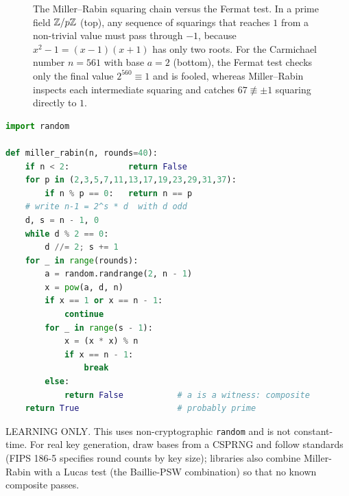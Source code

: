 \begin{figure}[H]
\caption{The Miller--Rabin squaring chain versus the Fermat test. In a prime field $\mathbb{Z}/p\mathbb{Z}$ (top), any sequence of squarings that reaches $1$ from a non-trivial value must pass through $-1$, because $x^2 - 1 = (x-1)(x+1)$ has only two roots. For the Carmichael number $n = 561$ with base $a = 2$ (bottom), the Fermat test checks only the final value $2^{560} \equiv 1$ and is fooled, whereas Miller--Rabin inspects each intermediate squaring and catches $67 \not\equiv \pm 1$ squaring directly to $1$.}
\label{ch40:fig-miller-rabin}
\end{figure}

\begin{implementbox}
\begin{lstlisting}[language=Python]
import random

def miller_rabin(n, rounds=40):
    if n < 2:            return False
    for p in (2,3,5,7,11,13,17,19,23,29,31,37):
        if n % p == 0:   return n == p
    # write n-1 = 2^s * d  with d odd
    d, s = n - 1, 0
    while d % 2 == 0:
        d //= 2; s += 1
    for _ in range(rounds):
        a = random.randrange(2, n - 1)
        x = pow(a, d, n)
        if x == 1 or x == n - 1:
            continue
        for _ in range(s - 1):
            x = (x * x) % n
            if x == n - 1:
                break
        else:
            return False           # a is a witness: composite
    return True                    # probably prime
\end{lstlisting}
LEARNING ONLY. This uses non-cryptographic \texttt{random} and is not constant-time. For real key
generation, draw bases from a CSPRNG and follow standards (FIPS 186-5 specifies round counts by key
size); libraries also combine Miller-Rabin with a Lucas test (the Baillie-PSW combination) so that no
known composite passes.
\end{implementbox}

